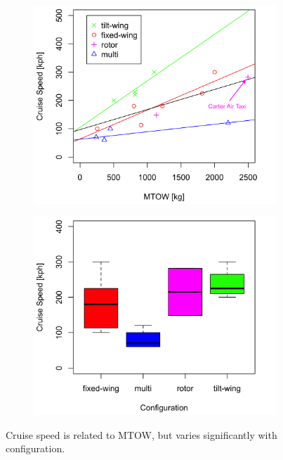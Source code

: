 \begin{figure}[H]
\captionsetup[subfigure]{justification=centering}
\begin{subfigure}[t]{0.5\textwidth}
    \centering
    \includegraphics[width=\textwidth]{Figures/Cruise-MTOW.png}
    \caption{}
    \label{fig:Cruise-MTOW}
\end{subfigure}
\begin{subfigure}[t]{0.5\textwidth}
    \centering
    \includegraphics[width=\textwidth]{Figures/Cruise-config.png}
    \caption{}
    \label{fig:Cruise-config}
\end{subfigure}
    \captionsetup{justification=centering}
    \caption{Cruise speed is related to MTOW, but varies significantly with configuration.}
    \label{fig:Cruise}
\end{figure}

